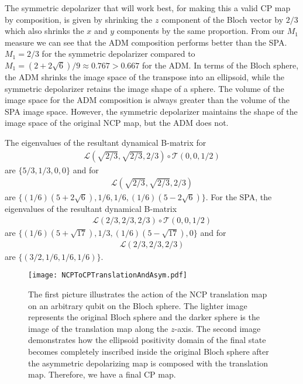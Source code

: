 \documentclass[12pt]{iopart}
\begin{document}
The symmetric depolarizer that will work best, for making this a valid CP map by composition, is given by shrinking the $z$ component of the Bloch vector by $2/3$ which also shrinks the $x$ and $y$ components by the same proportion. From our $M_1$ measure we can see that the ADM composition performs  better than the SPA. $M_1=2/3$ for the symmetric depolarizer compared to $M_1=(2+2\sqrt{6})/9 \approx 0.767 > 0.667$ for the ADM. In terms of the Bloch sphere, the ADM shrinks the image space of the transpose into an ellipsoid, while the symmetric depolarizer retains the image shape of a sphere. The volume of the image space for the ADM composition is always greater than the volume of the SPA image space. However, the symmetric depolarizer maintains the shape of the image space of the original NCP map, but the ADM does not.

The eigenvalues of the resultant dynamical B-matrix for
\begin{align}
    \mathcal{L}(\sqrt{2/3}, \sqrt{2/3}, 2/3) \circ \mathcal{T}(0, 0, 1/2)
\end{align}
are $\{ 5/3, 1/3, 0, 0 \}$ and for 
\begin{align}
    \mathcal{L}(\sqrt{2/3}, \sqrt{2/3}, 2/3)
\end{align} are $\{ (1/6)(5+2 \sqrt{6}), 1/6, 1/6, (1/6)(5-2 \sqrt{6}) \}$. 
For the SPA, the eigenvalues of the resultant dynamical B-matrix
\begin{align}
    \mathcal{L}(2/3, 2/3, 2/3) \circ \mathcal{T}(0, 0, 1/2)
\end{align} are $\{ (1/6)(5+\sqrt{17}), 1/3, (1/6)(5-\sqrt{17}),0 \}$ and for
\begin{align}
    \mathcal{L}(2/3, 2/3, 2/3)
\end{align} are $\{ (3/2, 1/6, 1/6, 1/6) \}$.
\begin{figure}[h]
    \centering
    \texttt{[image: NCPToCPTranslationAndAsym.pdf]}
    \caption{The first picture illustrates the action of the NCP translation map on an arbitrary qubit on the Bloch sphere. The lighter image represents the original Bloch sphere and the darker sphere is the image of the translation map along the $z$-axis. The second image demonstrates how the ellipsoid positivity domain of the final state becomes completely inscribed inside the original Bloch sphere after the asymmetric depolarizing map is composed with the translation map. Therefore, we have a final CP map.}
    \label{Fig:NCP_to_CP_via_asym}
\end{figure} 
\end{document}
